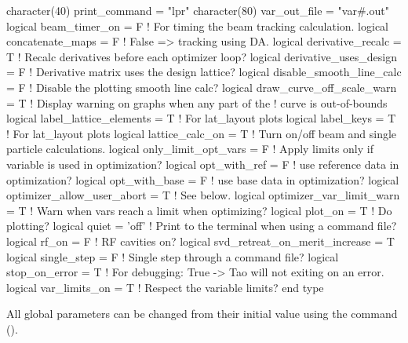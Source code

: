 {{{{{{{\begin{example}
  character(40)  print_command = "lpr"
  character(80)  var_out_file  = "var#.out"
  logical beam_timer_on = F               ! For timing the beam tracking calculation.
  logical concatenate_maps = F           ! False => tracking using DA.
  logical derivative_recalc = T          ! Recalc derivatives before each optimizer loop?
  logical derivative_uses_design = F     ! Derivative matrix uses the design lattice?
  logical disable_smooth_line_calc = F   ! Disable the plotting smooth line calc?
  logical draw_curve_off_scale_warn = T  ! Display warning on graphs when any part of the 
                                         !   curve is out-of-bounds
  logical label_lattice_elements = T     ! For lat_layout plots
  logical label_keys = T                 ! For lat_layout plots
  logical lattice_calc_on = T            ! Turn on/off beam and single particle calculations.
  logical only_limit_opt_vars = F        ! Apply limits only if variable is used in optimization?
  logical opt_with_ref = F               ! use reference data in optimization?
  logical opt_with_base = F              ! use base data in optimization?
  logical optimizer_allow_user_abort = T ! See below.
  logical optimizer_var_limit_warn = T   ! Warn when vars reach a limit when optimizing?
  logical plot_on = T                    ! Do plotting?
  logical quiet = 'off'                  ! Print to the terminal when using a command file?
  logical rf_on = F                      ! RF cavities on?
  logical svd_retreat_on_merit_increase = T    
  logical single_step = F                ! Single step through a command file?
  logical stop_on_error = T              ! For debugging: True -> Tao will not exiting on an error.
  logical var_limits_on = T              ! Respect the variable limits?
end type
\end{example}

All global parameters can be changed from their initial value using
the  command ().

  \begin{description}
  \item{\vn{global%
When constructing transfer Taylor maps the default method, used with \vn{global%
False, is to use Differential Algebra (DA) to integrate the map from the starting point to the
ending point.  Alternatively, with \vn{global%
integration region has an associated map, that map is concatenated with the map under construction.
This saves time but the potential drawback is a loss of accuracy. Note that a lattice element
will only have an associate map if the \vn{tracking_method} or \vn{make_mat6_method} components
of the lattice element are such that a map is needed for tracking (see the \bmad manual for more
details).

}}}}
\end{description}}}}}}}}
